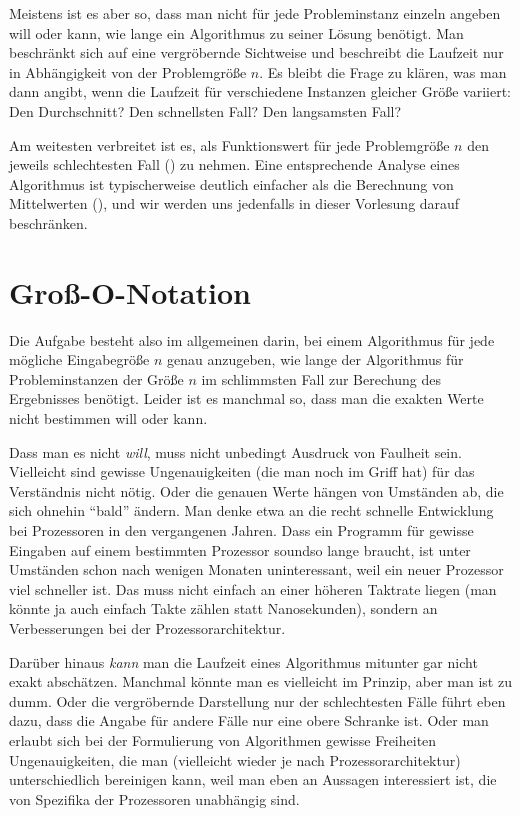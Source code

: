 Meistens ist es aber so, dass man nicht für jede Probleminstanz
einzeln angeben will oder kann, wie lange ein Algorithmus zu seiner
Lösung benötigt. Man beschränkt sich auf eine vergröbernde Sichtweise
und beschreibt \zB die Laufzeit nur in Abhängigkeit von der
Problemgröße $n$. Es bleibt die Frage zu klären, was man dann angibt,
wenn die Laufzeit für verschiedene Instanzen gleicher Größe variiert:
Den Durchschnitt? Den schnellsten Fall? Den langsamsten Fall?

Am weitesten verbreitet ist es, als Funktionswert für jede
Problemgröße $n$ den jeweils schlechtesten Fall () zu nehmen.  Eine
entsprechende Analyse eines Algorithmus ist typischerweise deutlich
einfacher als die Berechnung von Mittelwerten (), und wir werden
uns jedenfalls in dieser Vorlesung darauf beschränken.

\Tut\section{Gro\ss-O-Notation}
\label{sec:gross-o}

Die Aufgabe besteht also im allgemeinen darin,
bei einem Algorithmus für jede mögliche Eingabegröße $n$ genau
anzugeben, wie lange der Algorithmus für Probleminstanzen der Größe
$n$ im schlimmsten Fall zur Berechung des Ergebnisses benötigt. Leider
ist es manchmal so, dass man die exakten Werte nicht bestimmen will
oder kann.

Dass man es nicht \emph{will}, muss nicht unbedingt Ausdruck von Faulheit
sein. Vielleicht sind gewisse Ungenauigkeiten (die man noch im Griff
hat) für das Verständnis nicht nötig. Oder die genauen Werte hängen
von Umständen ab, die sich ohnehin "`bald"' ändern. Man denke etwa an
die recht schnelle Entwicklung bei Prozessoren in den vergangenen
Jahren. Dass ein Programm für gewisse Eingaben auf einem bestimmten
Prozessor soundso lange braucht, ist unter Umständen schon nach
wenigen Monaten uninteressant, weil ein neuer Prozessor viel schneller
ist. Das muss nicht einfach an einer höheren Taktrate liegen (man
könnte ja auch einfach Takte zählen statt Nanosekunden), sondern \zB
an Verbesserungen bei der Prozessorarchitektur.

Darüber hinaus \emph{kann} man die Laufzeit eines Algorithmus mitunter
gar nicht exakt abschätzen.  Manchmal könnte man es vielleicht im
Prinzip, aber man ist zu dumm.  Oder die vergröbernde Darstellung nur
der schlechtesten Fälle führt eben dazu, dass die Angabe für andere
Fälle nur eine obere Schranke ist. Oder man erlaubt sich bei der
Formulierung von Algorithmen gewisse Freiheiten \bzw Ungenauigkeiten,
die man (vielleicht wieder je nach Prozessorarchitektur)
unterschiedlich bereinigen kann, weil man eben an Aussagen
interessiert ist, die von Spezifika der Prozessoren unabhängig sind.

